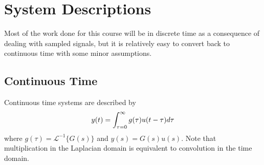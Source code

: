 
\mainmatter
\setcounter{page}{1}

\lectureseries[\course]{\course}

\date{October 1, 2009}

\setaddress

\setcounter{lecture}{2}
\setcounter{chapter}{2}


\section{System Descriptions}
Most of the work done for this course will be in discrete time as a consequence of dealing with sampled signals, but it is relatively easy to convert back to continuous time with some minor assumptions.

\subsection{Continuous Time}
Continuous time systems are described by
$$y(t) = \int_{\tau=0}^\infty g(\tau)u(t-\tau)d\tau$$
where $g(\tau)=\mathcal{L}^{-1}\lbrace G(s)\rbrace$ and $y(s)=G(s)u(s)$. Note that multiplication in the Laplacian domain is equivalent to convolution in the time domain.

